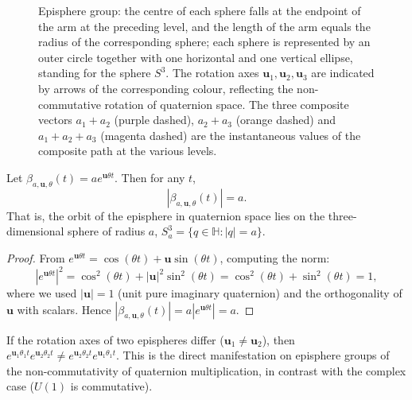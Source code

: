 \begin{figure}[htbp]
\caption{Episphere group: the centre of each sphere falls at the endpoint of the arm at the preceding level, and the length of the arm equals the radius of the corresponding sphere; each sphere is represented by an outer circle together with one horizontal and one vertical ellipse, standing for the sphere $S^3$. The rotation axes $\mathbf u_1,\mathbf u_2,\mathbf u_3$ are indicated by arrows of the corresponding colour, reflecting the non-commutative rotation of quaternion space. The three composite vectors $a_1+a_2$ (purple dashed), $a_2+a_3$ (orange dashed) and $a_1+a_2+a_3$ (magenta dashed) are the instantaneous values of the composite path at the various levels.}
\label{fig:dyn_epicycle_ball_group}
\end{figure}

\begin{proposition}\label{prop:dyn_epicycle_ball_norm}
Let $\beta_{a,\mathbf u,\theta}(t)=a e^{\mathbf u\theta t}$. Then for any $t$,
\[
|\beta_{a,\mathbf u,\theta}(t)|=a.
\]
That is, the orbit of the episphere in quaternion space lies on the three-dimensional sphere of radius $a$, $S^3_a=\{q\in\mathbb H:|q|=a\}$.
\end{proposition}

\begin{proof}
From $e^{\mathbf u\theta t}=\cos(\theta t)+\mathbf u\sin(\theta t)$, computing the norm:
\[
|e^{\mathbf u\theta t}|^2=\cos^2(\theta t)+|\mathbf u|^2\sin^2(\theta t)=\cos^2(\theta t)+\sin^2(\theta t)=1,
\]
where we used $|\mathbf u|=1$ (unit pure imaginary quaternion) and the orthogonality of $\mathbf u$ with scalars. Hence $|\beta_{a,\mathbf u,\theta}(t)|=a|e^{\mathbf u\theta t}|=a$.
\end{proof}

\begin{remark}\label{rem:dyn_epicycle_ball_noncommutative}
If the rotation axes of two epispheres differ ($\mathbf u_1\neq\mathbf u_2$), then $e^{\mathbf u_1\theta_1 t}e^{\mathbf u_2\theta_2 t}\neq e^{\mathbf u_2\theta_2 t}e^{\mathbf u_1\theta_1 t}$. This is the direct manifestation on episphere groups of the non-commutativity of quaternion multiplication, in contrast with the complex case ($U(1)$ is commutative).
\end{remark}


